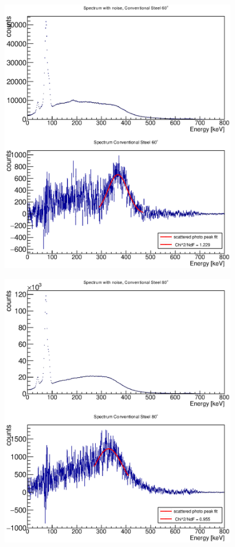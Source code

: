 \documentclass{article}
\begin{document}
\begin{figure}[H]
    \centering
    \includegraphics[width=0.9\textwidth]{Graphen/compton_spektren/60Stahl.eps}
    \caption{}
\end{figure}
\begin{figure}[H]
    \centering
    \includegraphics[width=0.9\textwidth]{Graphen/compton_spektren/80Stahl.eps}
    \caption{}
\end{figure}
\end{document}
